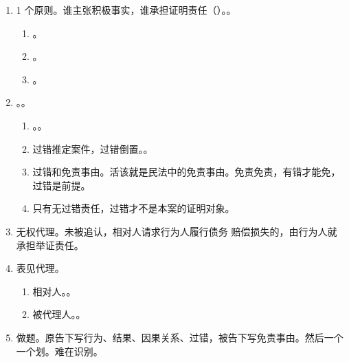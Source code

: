 \begin{enumerate}
\begin{enumerate}
                \begin{enumerate}
                  \item 1 个原则。谁主张积极事实，谁承担证明责任（）。。
                        \begin{enumerate}
                          \item {}。
                          \item {}。
                          \item {}。
                        \end{enumerate}
                  \item {}。。
                        \begin{enumerate}
                          \item {}。。
                          \item 过错推定案件，过错倒置。。
                          \item 过错和免责事由。活该就是民法中的免责事由。免责免责，有错才能免，过错是前提。
                          \item 只有无过错责任，过错才不是本案的证明对象。
                        \end{enumerate}
                  \item 无权代理。未被追认，相对人请求行为人履行债务 \hz 赔偿损失的，由行为人就承担举证责任。
                  \item 表见代理。
                        \begin{enumerate}
                          \item 相对人。。
                          \item 被代理人。。
                        \end{enumerate}
                  \item 做题。原告下写行为、结果、因果关系、过错，被告下写免责事由。然后一个一个划。难在识别。
                        \begin{enumerate}

\end{enumerate}
\end{enumerate}
\end{enumerate}
\end{enumerate}
